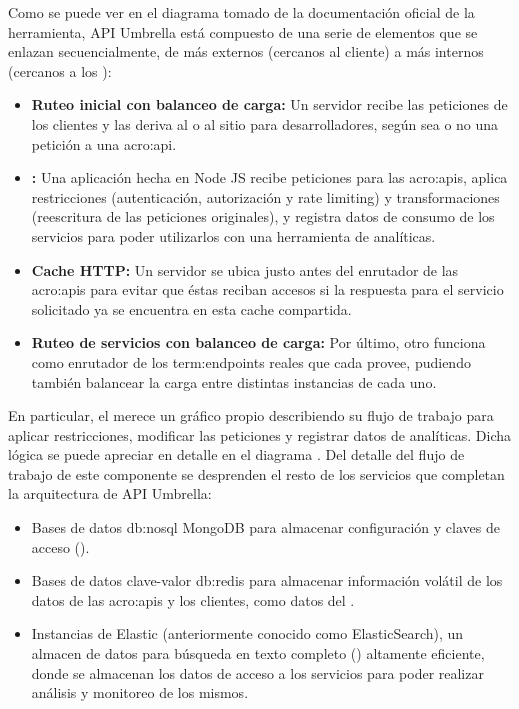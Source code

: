 Como se puede ver en el diagrama  tomado de la documentación oficial de la herramienta, API Umbrella está compuesto de una serie de elementos que se enlazan secuencialmente, de más externos (cercanos al cliente) a más internos (cercanos a los ):

\begin{itemize}
  \item \textbf{Ruteo inicial con balanceo de carga:} Un servidor  recibe las peticiones de los clientes y las deriva al  o al sitio para desarrolladores, según sea o no una petición a una \gls{acro:api}.
  \item \textbf{:} Una aplicación hecha en Node JS recibe peticiones para las \glspl{acro:api}, aplica restricciones (autenticación, autorización y rate limiting) y transformaciones (reescritura de las peticiones originales), y registra datos de consumo de los servicios para poder utilizarlos con una herramienta de analíticas.
  \item \textbf{Cache HTTP:} Un servidor  se ubica justo antes del enrutador de las \glspl{acro:api} para evitar que éstas reciban accesos si la respuesta para el servicio solicitado ya se encuentra en esta cache compartida.
  \item \textbf{Ruteo de servicios con balanceo de carga:} Por último, otro  funciona como enrutador de los \glspl{term:endpoint} reales que cada  provee, pudiendo también balancear la carga entre distintas instancias de cada uno.
\end{itemize}

En particular, el  merece un gráfico propio describiendo su flujo de trabajo para aplicar restricciones, modificar las peticiones y registrar datos de analíticas. Dicha lógica se puede apreciar en detalle en el diagrama . Del detalle del flujo de trabajo de este componente se desprenden el resto de los servicios que completan la arquitectura de API Umbrella:

\begin{itemize}
  \item Bases de datos \gls{db:nosql} MongoDB para almacenar configuración y claves de acceso ().
  \item Bases de datos clave-valor \gls{db:redis} para almacenar información volátil de los datos de las \glspl{acro:api} y los clientes, como datos del .
  \item Instancias de Elastic (anteriormente conocido como ElasticSearch), un almacen de datos para búsqueda en texto completo () altamente eficiente, donde se almacenan los datos de acceso a los servicios para poder realizar análisis y monitoreo de los mismos.
\end{itemize}

